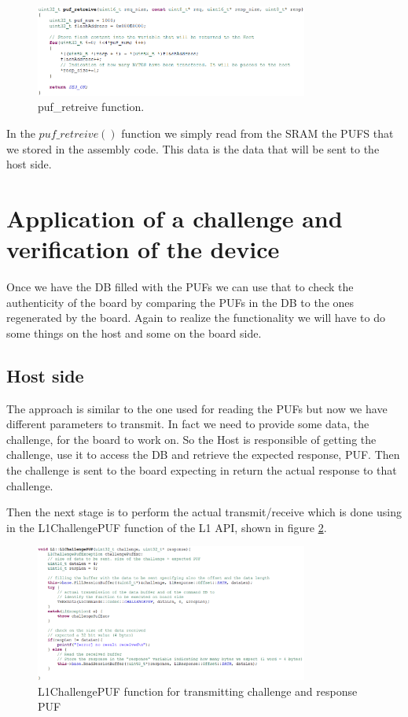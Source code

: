 \begin{figure}[h!]
	\vspace{0.5cm}
	\includegraphics[width = 0.8\textwidth]{images/puf_retreive.png}
	\caption{puf\_retreive function. }
	\label{fig:puf_retreive}
\end{figure}

In the $puf\_retreive()$ function we simply read from the SRAM the PUFS that we stored in the assembly code. This data is the data that will be sent to the host side.


\section {Application of a challenge and verification of the device} 
\label{section:impl_host}

Once we have the DB filled with the PUFs we can use that to check the authenticity of the board by comparing the PUFs in the DB to the ones regenerated by the board. Again to realize the functionality we will have to do some things on the host and some on the board side.

\subsection{Host side}

The approach is similar to the one used for reading the PUFs but now we have different parameters to transmit. In fact we need to provide some data, the challenge, for the board to work on. So the Host is responsible of getting the challenge, use it to access the DB and retrieve the expected response, PUF. Then the challenge is sent to the board expecting in return the actual response to that challenge.

Then the next stage is to perform the actual transmit/receive which is done using in the L1ChallengePUF function of the L1 API, shown in figure \ref{fig:L1ChallengePUF}.

\begin{figure}[h!]
	\vspace{0.5cm}
	\includegraphics[width = 0.8\textwidth]{images/L1ChallengePUF.png}
	\caption{L1ChallengePUF function for transmitting challenge and response PUF}
	\label{fig:L1ChallengePUF}
\end{figure}


